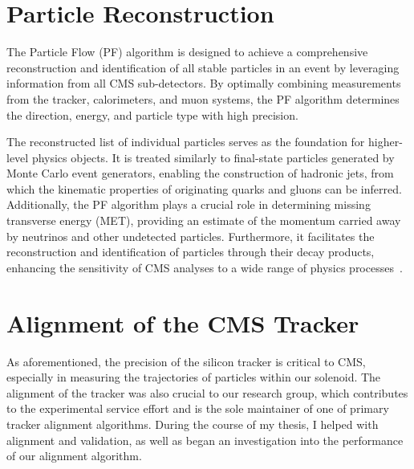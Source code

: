 \section{Particle Reconstruction}

The Particle Flow (PF) algorithm is designed to achieve a comprehensive reconstruction and identification of all stable particles in an event by leveraging information from all CMS sub-detectors. By optimally combining measurements from the tracker, calorimeters, and muon systems, the PF algorithm determines the direction, energy, and particle type with high precision.

The reconstructed list of individual particles serves as the foundation for higher-level physics objects. It is treated similarly to final-state particles generated by Monte Carlo event generators, enabling the construction of hadronic jets, from which the kinematic properties of originating quarks and gluons can be inferred. Additionally, the PF algorithm plays a crucial role in determining missing transverse energy (MET), providing an estimate of the momentum carried away by neutrinos and other undetected particles. Furthermore, it facilitates the reconstruction and identification of particles through their decay products, enhancing the sensitivity of CMS analyses to a wide range of physics processes~\cite{Beaudette:1645993}.


\section{Alignment of the CMS Tracker}

As aforementioned, the precision of the silicon tracker is critical to CMS, especially in measuring the trajectories of particles within our solenoid. The alignment of the tracker was also crucial to our research group, which contributes to the experimental service effort and is the sole maintainer of one of primary tracker alignment algorithms. During the course of my thesis, I helped with alignment and validation, as well as began an investigation into the performance of our alignment algorithm. 

